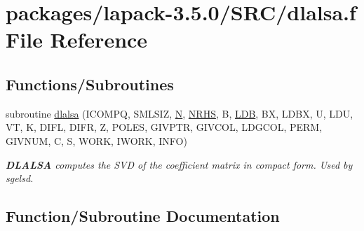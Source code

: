 \hypertarget{dlalsa_8f}{}\section{packages/lapack-\/3.5.0/\+S\+R\+C/dlalsa.f File Reference}
\label{dlalsa_8f}
\subsection*{Functions/\+Subroutines}
\begin{DoxyCompactItemize}
\item 
subroutine \hyperlink{dlalsa_8f_a5f0a01d46e43360ec61818501b449a5a}{dlalsa} (I\+C\+O\+M\+P\+Q, S\+M\+L\+S\+I\+Z, \hyperlink{polmisc_8c_a0240ac851181b84ac374872dc5434ee4}{N}, \hyperlink{example__user_8c_aa0138da002ce2a90360df2f521eb3198}{N\+R\+H\+S}, B, \hyperlink{example__user_8c_a50e90a7104df172b5a89a06c47fcca04}{L\+D\+B}, B\+X, L\+D\+B\+X, U, L\+D\+U, V\+T, K, D\+I\+F\+L, D\+I\+F\+R, Z, P\+O\+L\+E\+S, G\+I\+V\+P\+T\+R, G\+I\+V\+C\+O\+L, L\+D\+G\+C\+O\+L, P\+E\+R\+M, G\+I\+V\+N\+U\+M, C, S, W\+O\+R\+K, I\+W\+O\+R\+K, I\+N\+F\+O)
\begin{DoxyCompactList}\small\item\em {\bfseries D\+L\+A\+L\+S\+A} computes the S\+V\+D of the coefficient matrix in compact form. Used by sgelsd. \end{DoxyCompactList}\end{DoxyCompactItemize}


\subsection{Function/\+Subroutine Documentation}
\hypertarget{dlalsa_8f_a5f0a01d46e43360ec61818501b449a5a}{}
